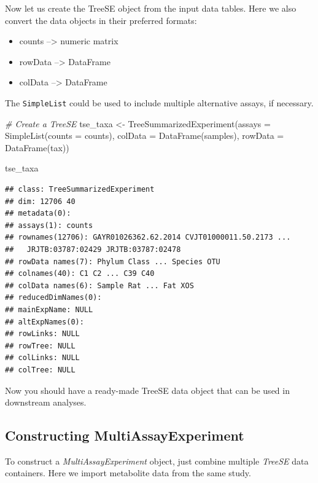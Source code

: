 \documentclass[
]{book}
\newenvironment{Shaded}{\begin{snugshade}}{\end{snugshade}}
\newcommand{\AttributeTok}[1]{\textcolor[rgb]{0.77,0.63,0.00}{#1}}
\newcommand{\CommentTok}[1]{\textcolor[rgb]{0.56,0.35,0.01}{\textit{#1}}}
\newcommand{\FunctionTok}[1]{\textcolor[rgb]{0.00,0.00,0.00}{#1}}
\newcommand{\NormalTok}[1]{#1}
\newcommand{\OtherTok}[1]{\textcolor[rgb]{0.56,0.35,0.01}{#1}}
\providecommand{\tightlist}{%
  \setlength{\itemsep}{0pt}\setlength{\parskip}{0pt}}
\begin{document}
Now let us create the TreeSE object from the input data tables. Here
we also convert the data objects in their preferred formats:

\begin{itemize}
\tightlist
\item
  counts --\textgreater{} numeric matrix
\item
  rowData --\textgreater{} DataFrame
\item
  colData --\textgreater{} DataFrame
\end{itemize}

The \texttt{SimpleList} could be used to include multiple alternative assays, if
necessary.

\begin{Shaded}
\begin{Highlighting}[]
\CommentTok{\# Create a TreeSE}
\NormalTok{tse\_taxa }\OtherTok{\textless{}{-}} \FunctionTok{TreeSummarizedExperiment}\NormalTok{(}\AttributeTok{assays =}  \FunctionTok{SimpleList}\NormalTok{(}\AttributeTok{counts =}\NormalTok{ counts),}
                                     \AttributeTok{colData =} \FunctionTok{DataFrame}\NormalTok{(samples),}
                                     \AttributeTok{rowData =} \FunctionTok{DataFrame}\NormalTok{(tax))}

\NormalTok{tse\_taxa}
\end{Highlighting}
\end{Shaded}

\begin{verbatim}
## class: TreeSummarizedExperiment 
## dim: 12706 40 
## metadata(0):
## assays(1): counts
## rownames(12706): GAYR01026362.62.2014 CVJT01000011.50.2173 ...
##   JRJTB:03787:02429 JRJTB:03787:02478
## rowData names(7): Phylum Class ... Species OTU
## colnames(40): C1 C2 ... C39 C40
## colData names(6): Sample Rat ... Fat XOS
## reducedDimNames(0):
## mainExpName: NULL
## altExpNames(0):
## rowLinks: NULL
## rowTree: NULL
## colLinks: NULL
## colTree: NULL
\end{verbatim}

Now you should have a ready-made TreeSE data object that can be used in downstream analyses.

\hypertarget{constructing-multiassayexperiment}{%
\subsection{Constructing MultiAssayExperiment}\label{constructing-multiassayexperiment}}

To construct a \emph{MultiAssayExperiment} object, just combine multiple \emph{TreeSE} data containers.
Here we import metabolite data from the same study.
\end{document}
